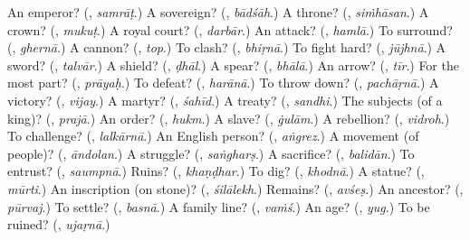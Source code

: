 \begin{tcolorbox}[breakable,colback=teal!4,colframe=teal!35!black,title={Before you move on}]
An emperor? (\textbf{}, \emph{samrāṭ}.) A sovereign? (\textbf{}, \emph{bādśāh}.) A throne? (\textbf{}, \emph{siṁhāsan}.) A crown? (\textbf{}, \emph{mukuṭ}.) A royal court? (\textbf{}, \emph{darbār}.) An attack? (\textbf{}, \emph{hamlā}.) To surround? (\textbf{}, \emph{ghernā}.) A cannon? (\textbf{}, \emph{top}.) To clash? (\textbf{}, \emph{bhiṛnā}.) To fight hard? (\textbf{}, \emph{jūjhnā}.) A sword? (\textbf{}, \emph{talvār}.) A shield? (\textbf{}, \emph{ḍhāl}.) A spear? (\textbf{}, \emph{bhālā}.) An arrow? (\textbf{}, \emph{tīr}.) For the most part? (\textbf{}, \emph{prāyaḥ}.) To defeat? (\textbf{}, \emph{harānā}.) To throw down? (\textbf{}, \emph{pachāṛnā}.) A victory? (\textbf{}, \emph{vijay}.) A martyr? (\textbf{}, \emph{śahīd}.) A treaty? (\textbf{}, \emph{sandhi}.) The subjects (of a king)? (\textbf{}, \emph{prajā}.) An order? (\textbf{}, \emph{hukm}.) A slave? (\textbf{}, \emph{ġulām}.) A rebellion? (\textbf{}, \emph{vidroh}.) To challenge? (\textbf{}, \emph{lalkārnā}.) An English person? (\textbf{}, \emph{aṅgrez}.) A movement (of people)? (\textbf{}, \emph{āndolan}.) A struggle? (\textbf{}, \emph{saṅgharṣ}.) A sacrifice? (\textbf{}, \emph{balidān}.) To entrust? (\textbf{}, \emph{saumpnā}.) Ruins? (\textbf{}, \emph{khaṇḍhar}.) To dig? (\textbf{}, \emph{khodnā}.) A statue? (\textbf{}, \emph{mūrti}.) An inscription (on stone)? (\textbf{}, \emph{śilālekh}.) Remains? (\textbf{}, \emph{avśeṣ}.) An ancestor? (\textbf{}, \emph{pūrvaj}.) To settle? (\textbf{}, \emph{basnā}.) A family line? (\textbf{}, \emph{vaṁś}.) An age? (\textbf{}, \emph{yug}.) To be ruined? (\textbf{}, \emph{ujaṛnā}.)
\end{tcolorbox}
